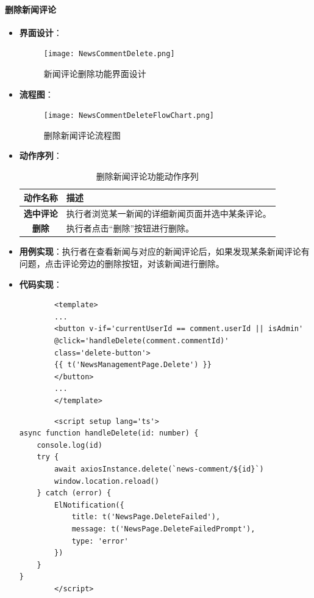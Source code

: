 \paragraph{删除新闻评论}
\begin{itemize}
	\item \textbf{界面设计}：

	\begin{figure}[H]
		\centering
		\texttt{[image: NewsCommentDelete.png]}
		\caption{新闻评论删除功能界面设计}
		\label{fig:news-report.png}
	\end{figure}

	\item \textbf{流程图}：
	\begin{figure}[H]
		\centering
		\texttt{[image: NewsCommentDeleteFlowChart.png]}
		\caption{删除新闻评论流程图}
		\label{NewsCommentReportFlowChart}
	\end{figure}
	\item \textbf{动作序列}：
	\begin{table}[H]
		\centering
		\caption{删除新闻评论功能动作序列}
		\renewcommand\arraystretch{1.5}
		\begin{tabular}{|c|>{\raggedright\arraybackslash}p{10cm}|}
			\hline
			\textbf{动作名称} & \textbf{描述} \\ \hline
			\textbf{选中评论} & 执行者浏览某一新闻的详细新闻页面并选中某条评论。 \\ \hline
			\textbf{删除} & 执行者点击“删除”按钮进行删除。 \\ \hline
		\end{tabular}
	\end{table}
	\item \textbf{用例实现}：执行者在查看新闻与对应的新闻评论后，如果发现某条新闻评论有问题，点击评论旁边的删除按钮，对该新闻进行删除。

	\item \textbf{代码实现}：
	\begin{verbatim}
		<template>
		...
		<button v-if='currentUserId == comment.userId || isAdmin'
		@click='handleDelete(comment.commentId)'
		class='delete-button'>
		{{ t('NewsManagementPage.Delete') }}
		</button>
		...
		</template>
	\end{verbatim}
	
	\begin{verbatim}
		<script setup lang='ts'>
async function handleDelete(id: number) {
	console.log(id)
	try {
		await axiosInstance.delete(`news-comment/${id}`)
		window.location.reload()
	} catch (error) {
		ElNotification({
			title: t('NewsPage.DeleteFailed'),
			message: t('NewsPage.DeleteFailedPrompt'),
			type: 'error'
		})
	}
}
		</script>
	\end{verbatim}

\end{itemize}

